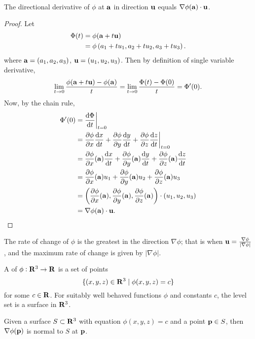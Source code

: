\begin{proposition}
The directional derivative of $\phi$ at $\vb{a}$ in direction $\vb{u}$ equals $\nabla\phi(\vb{a})\cdot\vb{u}$.
\end{proposition}

\begin{proof}
Let
\begin{align*}
\Phi(t)&=\phi(\vb{a}+t\vb{u})\\
&=\phi\left(a_1+tu_1,a_2+tu_2,a_3+tu_3\right).
\end{align*}
where $\vb{a}=(a_1,a_2,a_3)$, $\vb{u}=(u_1,u_2,u_3)$. Then by definition of single variable derivative,
\[\lim_{t\to0}\frac{\phi(\vb{a}+t\vb{u})-\phi(\vb{a})}{t}=\lim_{t\to0}\frac{\Phi(t)-\Phi(0)}{t}=\Phi^\prime(0).\]
Now, by the chain rule,
\begin{align*}
\Phi^\prime(0)&=\dv{\Phi}{t}\bigg|_{t=0}\\
&=\pdv{\phi}{x}\dv{x}{t}+\pdv{\phi}{y}\dv{y}{t}+\pdv{\phi}{z}\dv{z}{t}\bigg|_{t=0}\\
&=\pdv{\phi}{x}(\vb{a})\dv{x}{t}+\pdv{\phi}{y}(\vb{a})\dv{y}{t}+\pdv{\phi}{z}(\vb{a})\dv{z}{t}\\
&=\pdv{\phi}{x}(\vb{a})u_1+\pdv{\phi}{y}(\vb{a})u_2+\pdv{\phi}{z}(\vb{a})u_3\\
&=\left(\pdv{\phi}{x}(\vb{a}),\pdv{\phi}{y}(\vb{a}),\pdv{\phi}{z}(\vb{a})\right)\cdot\left(u_1,u_2,u_3\right)\\
&=\nabla\phi(\vb{a})\cdot\vb{u}.
\end{align*}
\end{proof}

\begin{corollary}
The rate of change of $\phi$ is the greatest in the direction $\nabla\phi$; that is when $\vb{u}=\frac{\nabla\phi}{|\nabla\phi|}$, and the maximum rate of change is given by $|\nabla\phi|$.
\end{corollary}

\begin{definition}
A  of $\phi:\mathbf R^3\to\mathbf R$ is a set of points
\[\{(x,y,z)\in\mathbf R^3\mid \phi(x,y,z)=c\}\]
for some $c\in\mathbf R$. For suitably well behaved functions $\phi$ and constants $c$, the level set is a
surface in $\mathbf R^3$.
\end{definition}

\begin{proposition}
Given a surface $S\subset\mathbf R^3$ with equation $\phi(x,y,z)=c$ and a point $\vb{p}\in S$, then $\nabla\phi(\vb{p})$ is normal to $S$ at $\vb{p}$.
\end{proposition}

